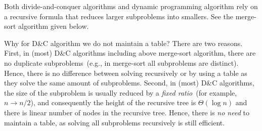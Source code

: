 Both divide-and-conquer algorithms and dynamic programming algorithm
rely on a recursive formula that reduces larger subproblems into smallers.
See the merge-sort algorithm given below.

\begin{algorithmblock}[0.8\textwidth]
        \xxx
        \xxx
        \xxx
        \xxx
        \xxx
\end{algorithmblock}

Why for D\&C algorithm we do not maintain a table?
There are two reasons.
First, in (most) D\&C algorithms including above merge-sort algorithm, 
there are no duplicate subproblems~(e.g., in merge-sort all subproblems are distinct).
Hence, there is no difference between
solving recursively or by using a table as they solve the same amount of subproblems.
Second, in (most) D\&C algorithms, the size of the subproblem is usually reduced by a \emph{fixed ratio}~(for example, $n\to n/2$),
and consequently the height of the recursive tree is $\Theta(\log n)$ and there is linear number of nodes in the recursive tree. 
Hence, there is \emph{no need} to maintain a table, as solving all subproblems recursively is still efficient.

